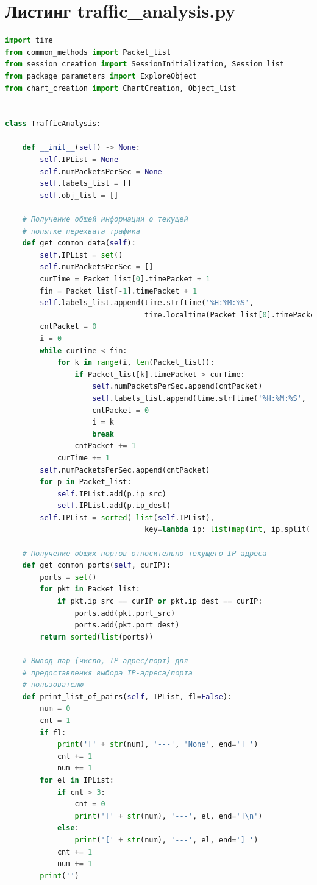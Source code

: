\documentclass[bachelor, och, coursework]{SCWorks}
\begin{document}
    \section{Листинг traffic\_analysis.py}

    \begin{lstlisting}[language=Python]
import time
from common_methods import Packet_list
from session_creation import SessionInitialization, Session_list
from package_parameters import ExploreObject
from chart_creation import ChartCreation, Object_list


class TrafficAnalysis:

    def __init__(self) -> None:
        self.IPList = None
        self.numPacketsPerSec = None
        self.labels_list = []
        self.obj_list = []

    # Получение общей информации о текущей
    # попытке перехвата трафика
    def get_common_data(self):
        self.IPList = set()
        self.numPacketsPerSec = []
        curTime = Packet_list[0].timePacket + 1
        fin = Packet_list[-1].timePacket + 1
        self.labels_list.append(time.strftime('%H:%M:%S', 
                                time.localtime(Packet_list[0].timePacket)))
        cntPacket = 0
        i = 0
        while curTime < fin:
            for k in range(i, len(Packet_list)):
                if Packet_list[k].timePacket > curTime:
                    self.numPacketsPerSec.append(cntPacket)
                    self.labels_list.append(time.strftime('%H:%M:%S', time.localtime(curTime)))
                    cntPacket = 0
                    i = k
                    break
                cntPacket += 1
            curTime += 1
        self.numPacketsPerSec.append(cntPacket)
        for p in Packet_list:
            self.IPList.add(p.ip_src)
            self.IPList.add(p.ip_dest)
        self.IPList = sorted( list(self.IPList), 
                                key=lambda ip: list(map(int, ip.split('.'))) )
    
    # Получение общих портов относительно текущего IP-адреса
    def get_common_ports(self, curIP):
        ports = set()
        for pkt in Packet_list:
            if pkt.ip_src == curIP or pkt.ip_dest == curIP:
                ports.add(pkt.port_src)
                ports.add(pkt.port_dest)
        return sorted(list(ports))

    # Вывод пар (число, IP-адрес/порт) для
    # предоставления выбора IP-адреса/порта
    # пользователю
    def print_list_of_pairs(self, IPList, fl=False):
        num = 0
        cnt = 1
        if fl:
            print('[' + str(num), '---', 'None', end='] ')
            cnt += 1
            num += 1
        for el in IPList:
            if cnt > 3:
                cnt = 0
                print('[' + str(num), '---', el, end=']\n')
            else:
                print('[' + str(num), '---', el, end='] ')
            cnt += 1
            num += 1
        print('')


\end{lstlisting}
\end{document}
